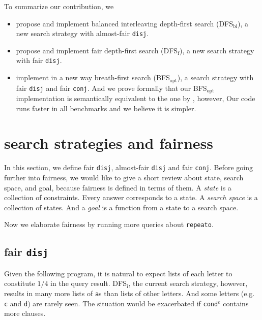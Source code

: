 \documentclass[format=acmlarge, review=true, authordraft=true]{acmart}
\newcommand{\conde}{\texttt{cond$^e$}}
\newcommand{\conj}{\texttt{conj}}
\newcommand{\disj}{\texttt{disj}}
\newcommand{\DFSi }[0]{DFS$_\textrm{i}$}
\newcommand{\DFSf }[0]{DFS$_\textrm{f}$}
\newcommand{\DFSbi}[0]{DFS$_\textrm{bi}$}
\newcommand{\BFSopt}[0]{BFS$_\textrm{opt}$}
\begin{document}
To summarize our contribution, we
\begin{itemize}
	\item propose and implement balanced interleaving depth-first search 
	(\DFSbi{}), a new search strategy with almost-fair \disj{}.
	\item propose and implement fair depth-first search (\DFSf{}), a 
	new search strategy with fair \disj{}.
	\item implement in a new way breath-first search (\BFSopt), 
        a search strategy 
	with fair \disj{} and fair \conj{}. And we prove formally that our 
\BFSopt{} implementation is semantically equivalent to the one 
by \citet{seres1999algebra}, however, Our code 
runs faster in all benchmarks and we believe it is simpler.
\end{itemize}

\section{search strategies and fairness}

In this section, we define fair \disj{}, almost-fair \disj{} and fair \conj{}. 
Before going further into fairness, we would like to give a short review about 
state, search space, and goal, because fairness is defined in terms of them. 
A \emph{state} is a collection of constraints. Every answer corresponds to a 
state. A \emph{search space} is a collection of states. And a \emph{goal} is a 
function from a state to a search space. 


Now we elaborate fairness by running more queries about \texttt{repeato}.

\subsection{fair \texttt{disj}}

Given the following program, it is natural to expect lists of each letter to
constitute $1/4$ in the query result. \DFSi, the current search
strategy, however, results in many more lists of \texttt{a}s than lists
of other letters. And some letters  (e.g. \texttt{c} and \texttt{d}) are
rarely seen. The situation would be exacerbated if \conde{} contains more 
clauses.

\begin{center}
	\begin{tabular}{c}
		
	\end{tabular}
\end{center}
\end{document}
